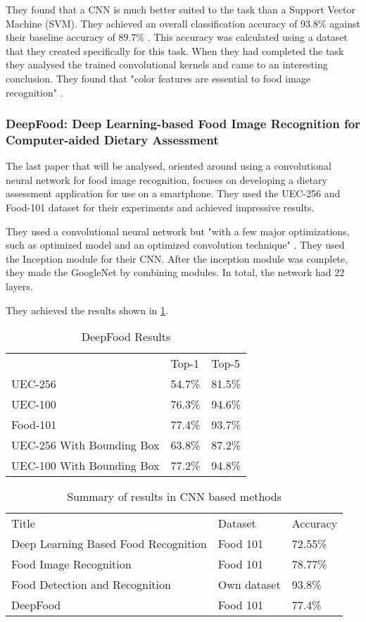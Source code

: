 They found that a CNN is much better suited to the task than a Support Vector
Machine (SVM). They achieved an overall classification accuracy of 93.8\%
against their baseline accuracy of 89.7\% \textcite{kagayaFood}. This accuracy
was calculated using a dataset that they created specifically for this task.
When they had completed the task they analysed the trained convolutional kernels
and came to an interesting conclusion. They found that "color features are
essential to food image recognition" \textcite{kagayaFood}.

\subsubsection*{DeepFood: Deep Learning-based Food Image Recognition for
Computer-aided Dietary Assessment}
The last paper that will be analysed, oriented around using a convolutional neural
network for food image recognition, focuses on developing a dietary assessment
application for use on a smartphone. They used the UEC-256 and Food-101 dataset
for their experiments and achieved impressive results.

They used a convolutional neural network but "with a few major optimizations,
such as optimized model and an optimized convolution technique"
\textcite{deepFood}. They used the Inception module for their CNN. After the
inception module was complete, they made the GoogleNet by combining modules. In
total, the network had 22 layers.

They achieved the results shown in \ref{resultsDeepFood}.

\begin{table}[]
	\centering
	\caption{DeepFood Results}
	\label{resultsDeepFood}
	\begin{tabular}{lll}
		& Top-1  & Top-5  \\
		UEC-256                   & 54.7\% & 81.5\% \\
		UEC-100                   & 76.3\% & 94.6\% \\
		Food-101                  & 77.4\% & 93.7\% \\
		UEC-256 With Bounding Box & 63.8\% & 87.2\% \\
		  UEC-100 With Bounding Box & 77.2\% & 94.8\%
	\end{tabular}
\end{table}

\begin{table}[]
	\centering
	\caption{Summary of results in CNN based methods}
	\label{cnn_summary}
	\begin{tabular}{lll}
		Title                                & Dataset     & Accuracy \\
		Deep Learning Based Food Recognition & Food 101    & 72.55\%  \\
		Food Image Recognition               & Food 101    & 78.77\%  \\
		Food Detection and Recognition       & Own dataset & 93.8\%   \\
		DeepFood                             & Food 101    & 77.4\%  
	\end{tabular}
\end{table}


